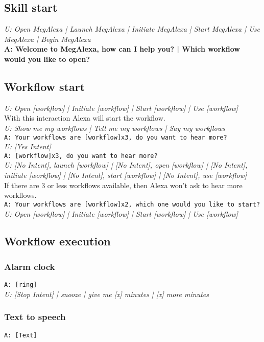 \subsection{Skill start} \label{SkillStart}
\textit{U: Open MegAlexa | Launch MegAlexa | Initiate MegAlexa | Start MegAlexa | Use MegAlexa | Begin MegAlexa}\\
\textbf{A: Welcome to MegAlexa, how can I help you? | Which workflow would you like to open?}

\subsection{Workflow start}
\textit{U: Open [workflow] | Initiate [workflow] | Start [workflow] | Use [workflow]}\\
With this interaction Alexa will start the workflow. \\
\textit{U: Show me my workflows | Tell me my workflows | Say my workflows}\\
\texttt{A: Your workflows are [workflow]x3, do you want to hear more?}\\
\textit{U: [Yes Intent]}\\
\texttt{A: [workflow]x3, do you want to hear more?}\\
\textit{U: [No Intent], launch [workflow] | [No Intent], open [workflow] | [No Intent], initiate [workflow] | [No Intent], start [workflow] | [No Intent], use [workflow]}\\
If there are 3 or less workflows available, then Alexa won't ask to hear more workflows.\\
\texttt{A: Your workflows are [workflow]x2, which one would you like to start? }\\
\textit{U: Open [workflow] | Initiate [workflow] | Start [workflow] | Use [workflow]}

\subsection{Workflow execution}
\subsubsection{Alarm clock}
\texttt{A: [ring]}\\
\textit{U: [Stop Intent] | snooze | give me [x] minutes | [x] more minutes}

\subsubsection{Text to speech}
\texttt{A: [Text]}

